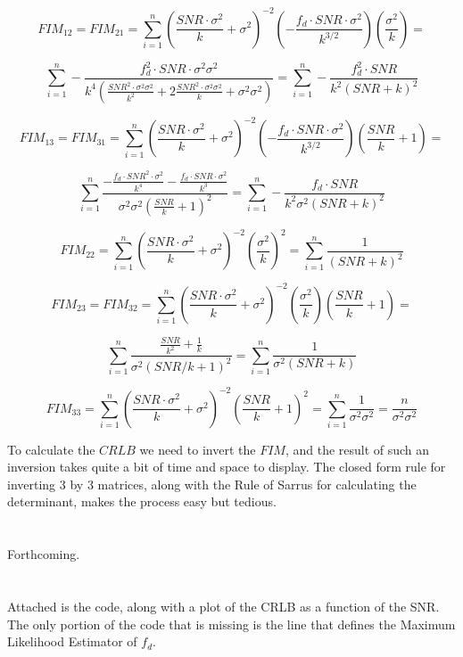 \documentclass{article}
\begin{document}
\[
FIM_{12} = FIM_{21} = \sum^n_{i=1} \left( \frac{SNR \cdot \sigma^2}{k} + \sigma^2 \right)^{-2}
\left( -\frac{f_d \cdot SNR \cdot \sigma^2}{k^{3/2}} \right) 
\left( \frac{\sigma^2}{k}\right) =
\]

\[
\sum^n_{i=1} -\frac{f^2_d \cdot SNR \cdot \sigma^2\sigma^2}
{k^4 \left( \frac{SNR^2 \cdot \sigma^2\sigma^2}{k^2} + 2\frac{SNR^2 \cdot \sigma^2\sigma^2}{k} + \sigma^2\sigma^2 \right)} =
\sum^n_{i=1} -\frac{f^2_d \cdot SNR}{k^2(SNR+k)^2}
\]

\vspace{2em}

\[
FIM_{13} = FIM_{31} = \sum^n_{i=1} \left( \frac{SNR \cdot \sigma^2}{k} + \sigma^2 \right)^{-2}
\left( -\frac{f_d \cdot SNR \cdot \sigma^2}{k^{3/2}} \right)
\left( \frac{SNR}{k}+1 \right) =
\]

\[
\sum^n_{i=1} \frac{-\frac{f_d \cdot SNR^2 \cdot \sigma^2}{k^4} - \frac{f_d \cdot SNR \cdot \sigma^2}{k^3}}
{\sigma^2\sigma^2 \left( \frac{SNR}{k} + 1 \right)^2} =
\sum^n_{i=1} -\frac{f_d \cdot SNR}{k^2\sigma^2 (SNR + k)^2}
\]

\vspace{2em}

\[
FIM_{22} = \sum^n_{i=1} \left( \frac{SNR \cdot \sigma^2}{k} + \sigma^2 \right)^{-2}
\left( \frac{\sigma^2}{k}\right)^2 = \sum^n_{i=1} \frac{1}{(SNR + k)^2}
\]

\vspace{2em}

\[
FIM_{23} = FIM_{32} = \sum^n_{i=1} \left( \frac{SNR \cdot \sigma^2}{k} + \sigma^2 \right)^{-2}
\left( \frac{\sigma^2}{k}\right) \left( \frac{SNR}{k}+1 \right) =
\]

\[
\sum^n_{i=1}\frac{\frac{SNR}{k^2} + \frac{1}{k}}{\sigma^2(SNR/k+1)^2} = \sum^n_{i=1} \frac{1}{\sigma^2(SNR+k)}
\]

\vspace{2em}

\[
FIM_{33} = \sum^n_{i=1} \left( \frac{SNR \cdot \sigma^2}{k} + \sigma^2 \right)^{-2}
\left( \frac{SNR}{k}+1 \right)^2 = \sum^n_{i=1} \frac{1}{\sigma^2\sigma^2} =
\frac{n}{\sigma^2\sigma^2}
\]

To calculate the $CRLB$ we need to invert the $FIM$, and the result of such an inversion takes quite a bit of time and
space to display. The closed form rule for inverting 3 by 3 matrices,
along with the Rule of Sarrus for calculating the determinant, makes the process easy but tedious.

\section{}
Forthcoming.

\section{}
Attached is the code, along with a plot of the CRLB as a function of the SNR.
The only portion of the code that is missing is the line that defines the Maximum Likelihood Estimator
of $f_d$.
\end{document}
